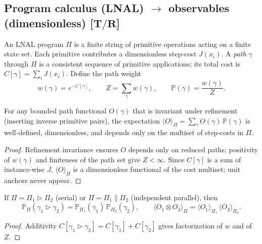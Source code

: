 \documentclass[11pt]{article}
\begin{document}
\subsection{Program calculus (LNAL) \(\rightarrow\) observables (dimensionless) \texorpdfstring{[$\mathbf{T/R}$]}{[T/R]}}
\label{subsec:lnal-obs}

\begin{definition}
An LNAL program \(\Pi\) is a finite string of primitive operations acting on a finite state set. Each primitive contributes a dimensionless step‑cost \(J(x_i)\). A \emph{path} \(\gamma\) through \(\Pi\) is a consistent sequence of primitive applications; its total cost is \(C[\gamma]=\sum_i J(x_i)\). Define the path weight
\[
w(\gamma)=e^{-C[\gamma]},\qquad Z=\sum_{\gamma} w(\gamma),\qquad \mathbb P(\gamma)=\frac{w(\gamma)}{Z}.
\]
\end{definition}

\begin{theorem}
\label{thm:anchor-free}
For any bounded path functional \(O(\gamma)\) that is invariant under refinement (inserting inverse primitive pairs), the expectation
\(\displaystyle \langle O\rangle_{\Pi}=\sum_{\gamma} O(\gamma)\,\mathbb P(\gamma)\)
is well‑defined, dimensionless, and depends only on the multiset of step‑costs in \(\Pi\).
\end{theorem}

\begin{proof}
Refinement invariance ensures \(O\) depends only on reduced paths; positivity of \(w(\gamma)\) and finiteness of the path set give \(Z<\infty\). Since \(C[\gamma]\) is a sum of instance‑wise \(J\), \(\langle O\rangle_{\Pi}\) is a dimensionless functional of the cost multiset; unit anchors never appear.
\end{proof}

\begin{proposition}
\label{prop:comp}
If \(\Pi=\Pi_{1}\triangleright\Pi_{2}\) (serial) or \(\Pi=\Pi_{1}\parallel\Pi_{2}\) (independent parallel), then
\[
\mathbb P_{\Pi}(\gamma_1\triangleright\gamma_2)
=\mathbb P_{\Pi_1}(\gamma_1)\,\mathbb P_{\Pi_2}(\gamma_2),
\qquad
\langle O_1\otimes O_2\rangle_{\Pi}
=\langle O_1\rangle_{\Pi_1}\,\langle O_2\rangle_{\Pi_2}.
\]
\end{proposition}

\begin{proof}
Additivity \(C[\gamma_1\triangleright\gamma_2]=C[\gamma_1]+C[\gamma_2]\) gives factorization of \(w\) and of \(Z\).
\end{proof}
\end{document}
